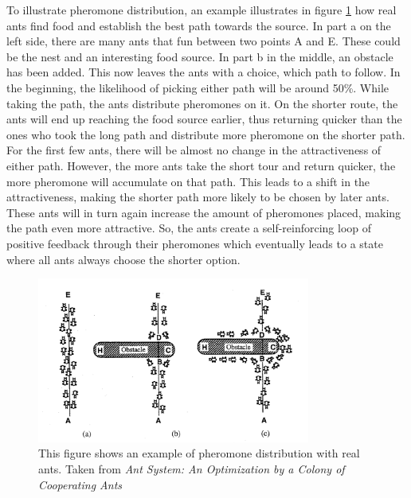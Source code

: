 To illustrate pheromone distribution, an example illustrates in figure \ref{fig:antSystemExampleIllustration} how real ants find food and establish the best path towards the source. 
In part a on the left side, there are many ants that fun between two points A and E. 
These could be the nest and an interesting food source.
In part b in the middle, an obstacle has been added.
This now leaves the ants with a choice, which path to follow. 
In the beginning, the likelihood of picking either path will be around 50\%.
While taking the path, the ants distribute pheromones on it. 
On the shorter route, the ants will end up reaching the food source earlier, thus returning quicker than the ones who took the long path and distribute more pheromone on the shorter path.
For the first few ants, there will be almost no change in the attractiveness of either path.
However, the more ants take the short tour and return quicker, the more pheromone will accumulate on that path.
This leads to a shift in the attractiveness, making the shorter path more likely to be chosen by later ants.
These ants will in turn again increase the amount of pheromones placed, making the path even more attractive.
So, the ants create a self-reinforcing loop of positive feedback through their pheromones which eventually leads to a state where all ants always choose the shorter option.


\begin{figure}[H]
	\begin{centering}
		\includegraphics[width=0.8\textwidth]{bilder/antSystemExampleIllustration.png}
		\caption{This figure shows an example of pheromone distribution with real ants. Taken from \textit{Ant System: An Optimization by a Colony of Cooperating Ants}\cite{dorigo_ant_1996}}
		\label{fig:antSystemExampleIllustration}
	\end{centering}
\end{figure}


